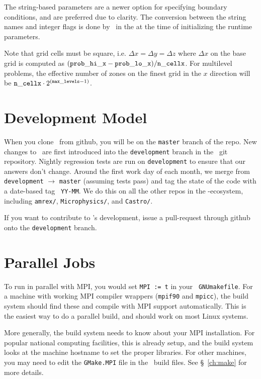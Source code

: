 \begin{itemize}
\begin{itemize}
   \end{itemize}

  The string-based parameters are a newer option for specifying
  boundary conditions, and are preferred due to clarity.  The
  conversion between the string names and integer flags is done
  by \amrex\ in the  at the time of initializing
  the runtime parameters.

\end{itemize}

Note that grid cells must be square, i.e. $\Delta x = \Delta y = \Delta z$
where $\Delta x$ on the base grid is computed as $({\tt prob\_hi\_x}
- {\tt prob\_lo\_x})/{\tt n\_cellx}$.  For multilevel problems, the effective
number of zones on the finest grid in the $x$ direction will be
${\tt n\_cellx} \cdot 2^{({\tt max\_levels} -1)}$.


\section{Development Model}

When you clone \maestroex\ from github, you will be on the {\tt master}
branch of the repo.  New changes to \maestroex\ are first introduced
into the {\tt development} branch in the \maestroex\ git repository.
Nightly regression tests are run on {\tt development} to ensure that
our answers don't change.  Around the first work day of each month, we
merge from {\tt development} $\rightarrow$ {\tt master} (assuming
tests pass) and tag the state of the code with a date-based tag {\tt
  YY-MM}.  We do this on all the other repos in the \amrex-ecosystem,
including {\tt amrex/}, {\tt Microphysics/}, and {\tt Castro/}.  

If you want to contribute to \maestroex's development, issue a pull-request
through github onto the {\tt development} branch.


\section{Parallel Jobs}

To run in parallel with MPI, you would set {\tt MPI := t} in your {\tt
  GNUmakefile}.  For a machine with working MPI compiler wrappers
({\tt mpif90} and {\tt mpicc}), the build system should find these and
compile with MPI support automatically.  This is the easiest way to do
a parallel build, and should work on most Linux systems.

More generally, the build system needs to know about your MPI
installation.  For popular national computing facilities, this is
already setup, and the build system looks at the machine hostname to
set the proper libraries.  For other machines, you may need to edit
the {\tt GMake.MPI} file in the \amrex\ build files.  See
\S~\ref{ch:make} for more details.

